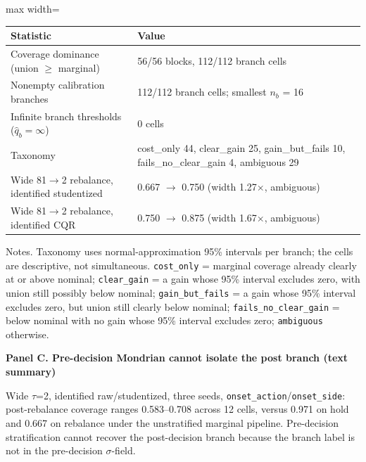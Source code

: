 \begin{table}[!htbp]
\begin{adjustbox}{max width=\linewidth}
\begin{tabular}{@{}ll@{}}
\toprule
Statistic & Value \\
\midrule
Coverage dominance (union $\ge$ marginal) & 56/56 blocks, 112/112 branch cells \\
Nonempty calibration branches & 112/112 branch cells; smallest $n_b$ = 16 \\
Infinite branch thresholds ($\hat q_b=\infty$) & 0 cells \\
Taxonomy & cost\_only 44, clear\_gain 25, gain\_but\_fails 10, fails\_no\_clear\_gain 4, ambiguous 29 \\
Wide 81$\to$2 rebalance, identified studentized & 0.667 $\to$ 0.750 (width 1.27$\times$, ambiguous) \\
Wide 81$\to$2 rebalance, identified CQR & 0.750 $\to$ 0.875 (width 1.67$\times$, ambiguous) \\
\bottomrule
\end{tabular}
\end{adjustbox}
\vspace{0.5em}
\par\noindent\begin{minipage}{\linewidth}\raggedright{\scriptsize Notes. Taxonomy uses normal-approximation 95\% intervals per branch; the cells are descriptive, not simultaneous. \texttt{cost\_only} = marginal coverage already clearly at or above nominal; \texttt{clear\_gain} = a gain whose 95\% interval excludes zero, with union still possibly below nominal; \texttt{gain\_but\_fails} = a gain whose 95\% interval excludes zero, but union still clearly below nominal; \texttt{fails\_no\_clear\_gain} = below nominal with no gain whose 95\% interval excludes zero; \texttt{ambiguous} otherwise.}\end{minipage}\par

\vspace{0.4em}
\par\textbf{Panel C. Pre-decision Mondrian cannot isolate the post branch (text summary)}
\vspace{0.1em}

\par\noindent\begin{minipage}{\linewidth}\raggedright{\scriptsize Wide $\tau$=2, identified raw/studentized, three seeds, \texttt{onset\_action}/\texttt{onset\_side}: post-rebalance coverage ranges 0.583--0.708 across 12 cells, versus 0.971 on hold and 0.667 on rebalance under the unstratified marginal pipeline. Pre-decision stratification cannot recover the post-decision branch because the branch label is not in the pre-decision $\sigma$-field.}\end{minipage}\par


\end{table}
